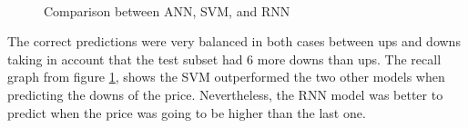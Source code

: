 \begin{figure}
\center
{} 
 \\
\caption{Comparison between ANN, SVM, and RNN}
\label{fig:comparison}
\end{figure}

The correct predictions were very balanced in both cases between ups and downs taking in account that the test subset had 6 more downs than ups. The recall graph from figure \ref{fig:comparison}, shows the SVM outperformed the two other models when predicting the downs of the price. Nevertheless, the RNN model was better to predict when the price was going to be higher than the last one.

